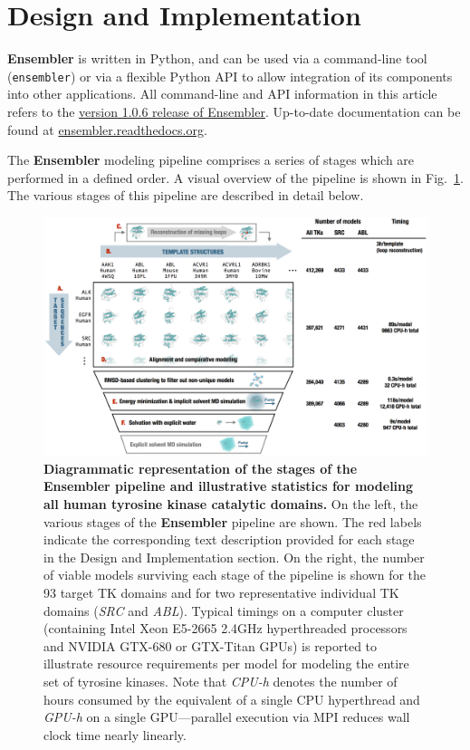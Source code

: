 \documentclass[aps,pre,twocolumn,nofootinbib,superscriptaddress,linenumbers]{revtex4-1}
\begin{document}
\section{Design and Implementation}

{\bf Ensembler} is written in Python, and can be used via a command-line tool ({\tt ensembler}) or via a flexible Python API to allow integration of its components into other applications.
All command-line and API information in this article refers to the \href{https://github.com/choderalab/ensembler/releases/tag/v1.0.6}{version 1.0.6 release of Ensembler}.
Up-to-date documentation can be found at \href{http://ensembler.readthedocs.org/en/latest/}{ensembler.readthedocs.org}.

The {\bf Ensembler} modeling pipeline comprises a series of stages which are performed in a defined order. 
A visual overview of the pipeline is shown in Fig.~\ref{figure:pipeline}.
The various stages of this pipeline are described in detail below.

\begin{figure}[tb]
    \includegraphics[width=1.0\textwidth]{pipeline/pipeline2}

  \caption{{\bf Diagrammatic representation of the stages of the Ensembler pipeline and illustrative statistics for modeling all human tyrosine kinase catalytic domains.}
  On the left, the various stages of the {\bf Ensembler} pipeline are shown.
  The red labels indicate the corresponding text description provided for each stage in the Design and Implementation section.
  On the right, the number of viable models surviving each stage of the pipeline is shown for the 93 target TK domains and for two representative individual TK domains (\emph{SRC} and \emph{ABL}).
  Typical timings on a computer cluster (containing Intel Xeon E5-2665 2.4GHz hyperthreaded processors and NVIDIA GTX-680 or GTX-Titan GPUs) is reported to illustrate resource requirements per model for modeling the entire set of tyrosine kinases.
  Note that \emph{CPU-h} denotes the number of hours consumed by the equivalent of a single CPU hyperthread and \emph{GPU-h} on a single GPU---parallel execution via MPI reduces wall clock time nearly linearly.
  }
  \label{figure:pipeline}
\end{figure}
\end{document}
